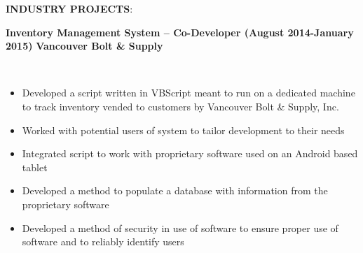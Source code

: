 \documentclass{article}
\begin{document}
\noindent \textbf{INDUSTRY PROJECTS}: \\
\begin{vwcol}[widths={0.8,0.2}, sep=.8cm, justify=flush, rule=0pt, indent=0em]
\noindent \textbf{Inventory Management System – Co-Developer (August 2014-January 2015)}
\newpage
\noindent \textbf{Vancouver Bolt \& Supply}
\end{vwcol}
\phantom \\
\begin{itemize}
\item Developed a script written in VBScript meant to run on a dedicated machine to track inventory vended to customers by Vancouver Bolt \& Supply, Inc.
\item Worked with potential users of system to tailor development to their needs
\item Integrated script to work with proprietary software used on an Android based tablet
\item Developed a method to populate a database with information from the proprietary software
\item Developed a method of security in use of software to ensure proper use of software and to reliably identify users
\end{itemize}
\phantom \\
\phantom \\
%
%
%
%
\par
\phantom \\
\phantom \\
\end{document}
